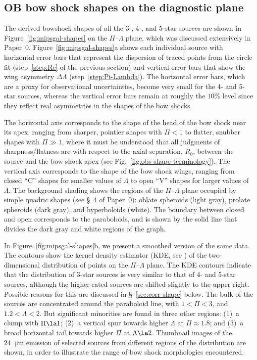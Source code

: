 \documentclass[useAMS, usenatbib, a4paper]{mnras}
\begin{document}
\subsection{OB bow shock shapes on the diagnostic plane}
\label{sec:ob-shapes}

The derived bowshock shapes of all the 3-, 4-, and 5-star sources are
shown in Figure~\ref{fig:mipsgal-shapes} on the \(\Pi\)--\(\Lambda\) plane,
which was discussed extensively in Paper~0.
Figure~\ref{fig:mipsgal-shapes}a shows each individual source with
horizontal error bars that represent the dispersion of traced points
from the circle fit (step~\ref{step:Rc} of the previous section) and
vertical error bars that show the wing asymmetry \(\Delta\Lambda\)
(step~\ref{step:Pi-Lambda}).  The horizontal error bars, which are a
proxy for observational uncertainties, become very small for the 4-
and 5-star sources, whereas the vertical error bars remain at roughly
the \(10\%\) level since they reflect real asymmetries in the shapes
of the bow shocks.

The horizontal axis corresponds to the shape of the head of the bow
shock near its apex, ranging from sharper, pointier shapes with
\(\Pi < 1\) to flatter, snubber shapes with \(\Pi \gg 1\), where it must be
understood that all judgments of sharpness/flatness are with respect
to the axial separation, \(R_0\), between the source and the bow shock
apex (see Fig.~\ref{fig:obs-shape-terminology}).  The vertical axis
corresponds to the shape of the bow shock wings, ranging from closed
``C'' shapes for smaller values of \(\Lambda\) to open ``V'' shapes for
larger values of \(\Lambda\).  The background shading shows the regions of
the \(\Pi\)--\(\Lambda\) plane occupied by simple quadric shapes (see \S~4 of
Paper~0): oblate spheroids (light gray), prolate spheroids (dark
gray), and hyperboloids (white). The boundary between closed and open
corresponds to the paraboloids, and is shown by the solid line
that divides the dark gray and white regions of the graph.

In Figure~\ref{fig:mipsgal-shapes}b, we present a smoothed version of
the same data.  The contours show the kernel density estimator (KDE,
see \citealp{Leiva-Murillo:2012a, Scott:2015a}) of the two-dimensional
distribution of points on the \(\Pi\)--\(\Lambda\) plane.  The KDE contours
indicate that the distribution of 3-star sources is very similar to
that of 4- and 5-star sources, although the higher-rated sources are
shifted slightly to the upper right.  Possible reasons for this are
discussed in \S~\ref{sec:corr-shape} below.
The bulk of the sources are concentrated around the paraboloid line,
with \(1 < \Pi < 3\), and \(1.2 < \Lambda < 2\).  But significant minorities
are found in three other regions: (1)~a clump with \(\Pi \la 1\); (2)~a
vertical spur towards higher \(\Lambda\) at \(\Pi \approx 1.8\); and (3)~a broad
horizontal tail towards higher \(\Pi\) at \(\Lambda \la 2\).  Thumbnail images
of the \SI{24}{\um} emission of selected sources from different
regions of the distribution are shown, in order to illustrate the
range of bow shock morphologies encountered.
\end{document}
